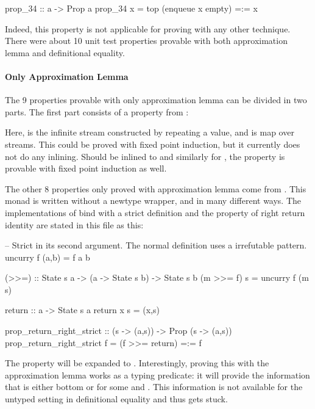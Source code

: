 \begin{code}
prop_34 :: a -> Prop a
prop_34 x = top (enqueue x empty) =:= x
\end{code}

\noindent
Indeed, this property is not applicable for proving with any other
technique. There were about 10 unit test properties provable with both
approximation lemma and definitional equality.

\paragraph{Only Approximation Lemma}
The 9 properties provable with only approximation lemma can be divided
in two parts. The first part consists of a property from :


\noindent
Here,  is the infinite stream constructed by repeating a
value, and \hs{<\$>} is map over streams. This could be proved with
fixed point induction, but it currently does not do any
inlining. Should  be inlined to  and similarly for
, the property is provable with fixed point induction as well.


The other 8 properties only proved with approximation lemma come from
. This monad is written without a newtype wrapper, and
in many different ways. The implementations of bind with a strict
 definition and the property of right return identity are
stated in this file as this:

\begin{code}
-- Strict in its second argument. The normal definition uses a irrefutable pattern.
uncurry f (a,b) = f a b

(>>=) :: State s a -> (a -> State s b) -> State s b
(m >>= f) s = uncurry f (m s)

return :: a -> State s a
return x s = (x,s)

prop_return_right_strict :: (s -> (a,s)) -> Prop (s -> (a,s))
prop_return_right_strict f = (f >>= return) =:= f
\end{code}

\noindent
The property will be expanded to .
Interestingly, proving this with the approximation lemma works as a
typing predicate: it will provide the information that  is
either bottom or  for some  and . This
information is not available for the untyped setting in definitional
equality and thus gets stuck.


